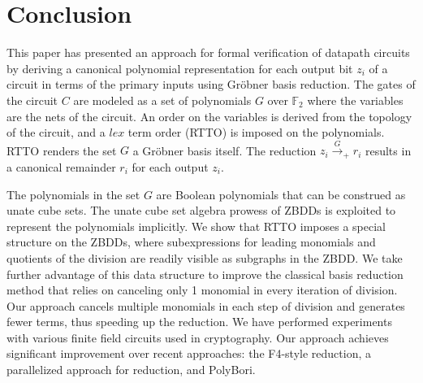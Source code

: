 


\section{Conclusion} \label{sec:conc}
This paper has presented an approach for formal verification of 
datapath circuits by deriving a canonical polynomial representation
for each output bit $z_i$ of a circuit in terms of the primary inputs
using Gr\"obner basis reduction. The gates of the circuit $C$ are
modeled as a set of polynomials $G$ over $\mathbb{F}_2$ where the
variables are the nets of the circuit. An order on the variables is
derived from the topology of the circuit, and a $lex$ term order
(RTTO) is imposed on the polynomials. RTTO renders the set $G$ a
Gr\"obner basis  itself. The reduction $z_i\xrightarrow{G}_+ r_i$
results in a canonical remainder $r_i$ for  each output $z_i$. 
\par The polynomials in the set $G$ are Boolean polynomials that can 
be construed as unate cube sets. The unate cube set algebra prowess of
ZBDDs is exploited to represent the polynomials implicitly. We show
that RTTO imposes a special structure on the ZBDDs, where
subexpressions for leading monomials and quotients of the division are
readily visible as subgraphs in the ZBDD. We take further advantage of
this data structure to improve the classical \Grobner basis reduction 
method that relies on canceling only 1 monomial in every iteration
of division. Our approach cancels multiple monomials in each step of
division and generates fewer terms, thus speeding up the reduction. 
We have performed experiments with various finite field circuits used in
cryptography. Our approach achieves significant improvement over
recent approaches: the F4-style reduction, a parallelized approach for
reduction, and PolyBori. 

